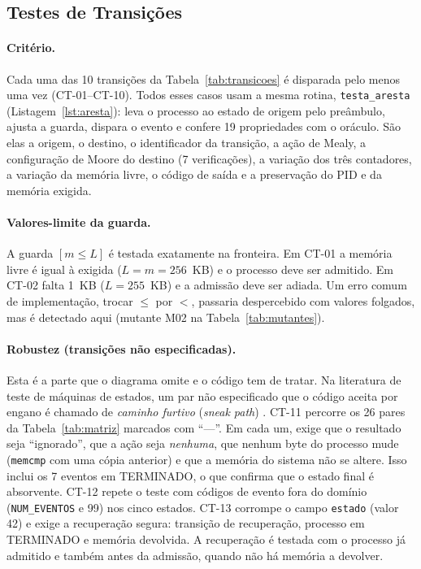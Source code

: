 \documentclass[11pt,a4paper]{article}
\theoremstyle{definition}
\newcommand{\est}[1]{\textsf{\small #1}}   %
\begin{document}
\subsection{Testes de Transições}\label{sec:testes-transicoes}

\paragraph{Critério.} Cada uma das 10 transições da Tabela~\ref{tab:transicoes} é disparada pelo
menos uma vez (CT-01--CT-10). Todos esses casos usam a mesma rotina,
\texttt{testa\_aresta} (Listagem~\ref{lst:aresta}): leva o processo ao estado de origem pelo
preâmbulo, ajusta a guarda, dispara o evento e confere 19 propriedades com o oráculo. São elas a
origem, o destino, o identificador da transição, a ação de Mealy, a configuração de Moore do
destino (7 verificações), a variação dos três contadores, a variação da memória livre, o código de
saída e a preservação do PID e da memória exigida.



\paragraph{Valores-limite da guarda.} A guarda $[m \le L]$ é testada exatamente na fronteira. Em
CT-01 a memória livre é igual à exigida ($L = m = 256$~KB) e o processo deve ser admitido. Em CT-02
falta 1~KB ($L = 255$~KB) e a admissão deve ser adiada. Um erro comum de implementação, trocar
$\le$ por $<$, passaria despercebido com valores folgados, mas é detectado aqui (mutante M02 na
Tabela~\ref{tab:mutantes}).

\paragraph{Robustez (transições não especificadas).} Esta é a parte que o diagrama omite e o código
tem de tratar. Na literatura de teste de máquinas de estados, um par não especificado que o código
aceita por engano é chamado de \emph{caminho furtivo} (\emph{sneak path}) \cite{chow,binder}. CT-11 percorre os 26 pares da Tabela~\ref{tab:matriz} marcados com ``---''. Em cada
um, exige que o resultado seja ``ignorado'', que a ação seja \emph{nenhuma}, que nenhum byte do
processo mude (\texttt{memcmp} com uma cópia anterior) e que a memória do sistema não se altere.
Isso inclui os 7 eventos em \est{TERMINADO}, o que confirma que o estado final é absorvente. CT-12
repete o teste com códigos de evento fora do domínio (\texttt{NUM\_EVENTOS} e 99) nos cinco estados.
CT-13 corrompe o campo \texttt{estado} (valor 42) e exige a recuperação segura: transição de
recuperação, processo em \est{TERMINADO} e memória devolvida. A recuperação é testada com o processo
já admitido e também antes da admissão, quando não há memória a devolver.
\end{document}
